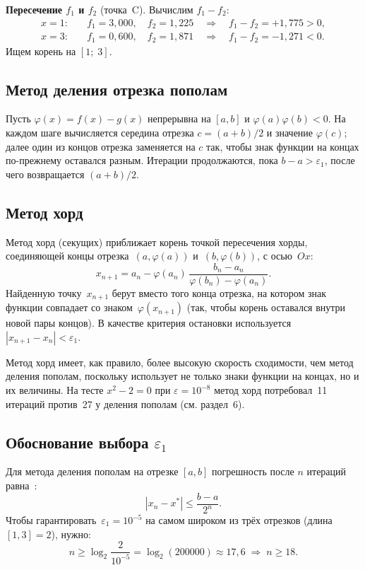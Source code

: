 \documentclass[a4paper,12pt,titlepage,finall]{article}
\begin{document}
\textbf{Пересечение $f_1$ и $f_2$} (точка~C). Вычислим $f_1 - f_2$:
\begin{align*}
    x = 1: \quad & f_1 = 3{,}000,\quad f_2 = 1{,}225 \quad\Rightarrow\quad f_1-f_2 = +1{,}775 > 0,\\
    x = 3: \quad & f_1 = 0{,}600,\quad f_2 = 1{,}871 \quad\Rightarrow\quad f_1-f_2 = -1{,}271 < 0.
\end{align*}
Ищем корень на $[1;\; 3]$.

\subsection{Метод деления отрезка пополам}

Пусть $\varphi(x) = f(x) - g(x)$ непрерывна на $[a,b]$ и $\varphi(a)\varphi(b) < 0$.
На каждом шаге вычисляется середина отрезка $c = (a+b)/2$ и значение $\varphi(c)$;
далее один из концов отрезка заменяется на $c$ так, чтобы знак функции на концах
по-прежнему оставался разным. Итерации продолжаются, пока $b - a > \varepsilon_1$,
после чего возвращается $(a+b)/2$.

\subsection{Метод хорд}

Метод хорд (секущих) приближает корень точкой пересечения хорды, соединяющей
концы отрезка~$(a,\varphi(a))$ и~$(b,\varphi(b))$, с осью~$Ox$:
\[
    x_{n+1} = a_n - \varphi(a_n)\,\frac{b_n - a_n}{\varphi(b_n) - \varphi(a_n)}.
\]
Найденную точку~$x_{n+1}$ берут вместо того конца отрезка, на котором знак
функции совпадает со знаком~$\varphi(x_{n+1})$ (так, чтобы корень оставался
внутри новой пары концов). В качестве критерия остановки используется
$|x_{n+1} - x_n| < \varepsilon_1$.

Метод хорд имеет, как правило, более высокую скорость сходимости, чем метод
деления пополам, поскольку использует не только знаки функции на концах, но и
их величины. На тесте $x^2 - 2 = 0$ при $\varepsilon = 10^{-8}$ метод хорд
потребовал~11 итераций против~27 у деления пополам (см. раздел~6).

\subsection{Обоснование выбора $\varepsilon_1$}

Для метода деления пополам на отрезке $[a,b]$ погрешность после $n$ итераций равна~\cite{math}:
\[
    |x_n - x^*| \leq \frac{b-a}{2^n}.
\]
Чтобы гарантировать~$\varepsilon_1 = 10^{-5}$ на самом широком из трёх отрезков
(длина~$[1,3] = 2$), нужно:
\[
    n \geq \log_2\!\frac{2}{10^{-5}} = \log_2(200000) \approx 17{,}6 \;\Rightarrow\; n \geq 18.
\]
\end{document}
